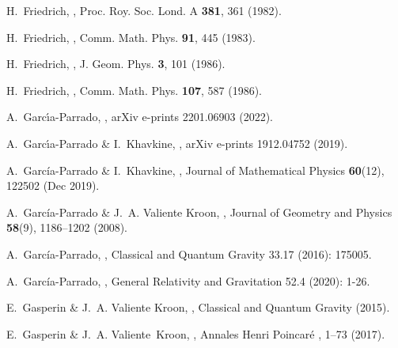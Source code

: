 \documentclass[10pt,a4paper]{article}
\theoremstyle{plain}
\begin{document}
\begin{thebibliography}{10}
H.~Friedrich,
,
\newblock Proc. Roy. Soc. Lond. A {\bf 381}, 361 (1982).

H.~Friedrich,
,
\newblock Comm. Math. Phys. {\bf 91}, 445 (1983).

H.~Friedrich,
,
\newblock J. Geom. Phys. {\bf 3}, 101 (1986).

H.~Friedrich,
,
\newblock Comm. Math. Phys. {\bf 107}, 587 (1986).

A.~Garc\'\i{}a-Parrado,
,
\newblock arXiv e-prints 2201.06903  (2022).


A.~Garc\'\i{}a-Parrado \& I.~Khavkine,
,
\newblock arXiv e-prints 1912.04752 (2019).

A.~García-Parrado \& I.~Khavkine,
,
\newblock Journal of Mathematical Physics {\bf 60}(12), 122502 (Dec 2019).

A.~García-Parrado \& J.~A. {Valiente Kroon},
,
\newblock Journal of Geometry and Physics {\bf 58}(9), 1186--1202 (2008).

A.~García-Parrado,
,
\newblock Classical and Quantum Gravity 33.17 (2016): 175005.

A.~García-Parrado,
,
\newblock General Relativity and Gravitation 52.4 (2020): 1-26.

E.~{Gasperin} \& J.~A. {Valiente Kroon},
,
\newblock Classical and Quantum Gravity  (2015).

E.~Gasperin \& J.~A. Valiente~Kroon,
,
\newblock Annales Henri Poincar{\'e} , 1--73 (2017).


\end{thebibliography}
\end{document}
